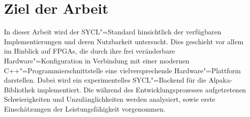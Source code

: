 \section{Ziel der Arbeit}\label{einleitung:ziel}

In dieser Arbeit wird der SYCL"=Standard hinsichtlich der verfügbaren
Implementierungen und deren Nutzbarkeit untersucht. Dies geschieht vor allem im
Hinblick auf FPGAs, die durch ihre frei veränderbare Hardware"=Konfiguration in
Verbindung mit einer modernen C++"=Programmierschnittstelle eine
vielversprechende Hardware"=Plattform darstellen. Dabei wird ein
experimentelles SYCL"=Backend für die Alpaka-Bibliothek implementiert. Die
während des Entwicklungsprozesses aufgetretenen Schwierigkeiten und
Unzulänglichkeiten werden analysiert, sowie erste Einschätzungen der
Leistungsfähigkeit vorgenommen.
